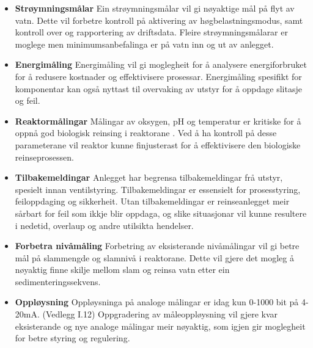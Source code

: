 \begin{itemize}
    \item \textbf{Strøymningsmålar} \newline
        Ein strøymningsmålar vil gi nøyaktige mål på flyt av vatn.
        Dette vil forbetre kontroll på aktivering av høgbelastningsmodus, samt kontroll over og rapportering av driftsdata.
        Fleire strøymningsmålarar er moglege men minimumsanbefalinga er på vatn inn og ut av anlegget.
    \item \textbf{Energimåling} \newline
        Energimåling vil gi moglegheit for å analysere energiforbruket for å redusere kostnader og effektivisere prosessar.
        Energimåling spesifikt for komponentar kan også nyttast til overvaking av utstyr for å oppdage slitasje og feil.
    \item \textbf{Reaktormålingar} \newline
        Målingar av oksygen, pH og temperatur er kritiske for å oppnå god biologisk reinsing i reaktorane \citep{SNL_PH}. \newline
        Ved å ha kontroll på desse parameterane vil reaktor kunne finjusterast for å effektivisere den biologiske reinseprosessen.
    \item \textbf{Tilbakemeldingar} \newline
        Anlegget har begrensa tilbakemeldingar frå utstyr, spesielt innan ventilstyring.
        Tilbakemeldingar er essensielt for prosesstyring, feiloppdaging og sikkerheit.
        Utan tilbakemeldingar er reinseanlegget meir sårbart for feil som ikkje blir oppdaga, 
        og slike situasjonar vil kunne resultere i nedetid, overlaup og andre utilsikta hendelser.
    \item \textbf{Forbetra nivåmåling} \newline
        Forbetring av eksisterande nivåmålingar vil gi betre mål på slammengde og slamnivå i reaktorane.
        Dette vil gjere det mogleg å nøyaktig finne skilje mellom slam og reinsa vatn etter ein sedimenteringssekvens.
    \item \textbf{Oppløysning} \newline
        Oppløysninga på analoge målingar er idag kun 0-1000 bit på 4-20mA. (Vedlegg I.12)\newline
        Oppgradering av måleoppløysning vil gjere kvar eksisterande og nye analoge målingar
        meir nøyaktig, som igjen gir moglegheit for betre styring og regulering.
\end{itemize}
\newpage


